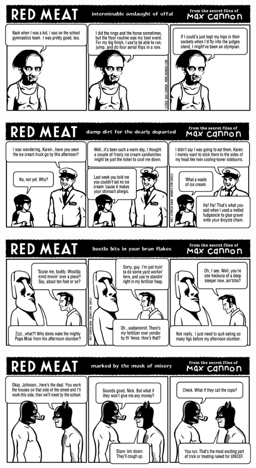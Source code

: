 \documentclass[a4paper,twoside,11pt]{article}
\begin{document}
\includegraphics[width=\textwidth]{redmeat_2002-10-01.png}



\includegraphics[width=\textwidth]{redmeat_2002-10-08.png}



\includegraphics[width=\textwidth]{redmeat_2002-10-15.png}



\includegraphics[width=\textwidth]{redmeat_2002-10-22.png}
\end{document}
